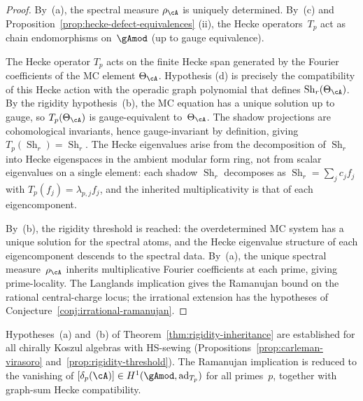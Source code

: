 \begin{proof}
By~(a), the spectral measure $\rho_\cA$ is uniquely determined.
By~(c) and Proposition~\ref{prop:hecke-defect-equivalences}%
(ii), the Hecke operators~$T_p$ act as chain endomorphisms
on~$\gAmod$ (up to gauge equivalence).

The Hecke operator $T_p$ acts on the finite Hecke span generated by
the Fourier coefficients of the MC element $\Theta_\cA$. Hypothesis
\textup{(d)} is precisely the compatibility of this Hecke action with
the operadic graph polynomial that defines
$\operatorname{Sh}_r(\Theta_\cA)$.
By the rigidity hypothesis~(b), the MC equation has a unique
solution up to gauge, so $T_p(\Theta_\cA)$ is gauge-equivalent
to~$\Theta_\cA$. The shadow projections are cohomological
invariants, hence gauge-invariant by definition, giving
$T_p(\operatorname{Sh}_r) = \operatorname{Sh}_r$.
The Hecke eigenvalues arise from the decomposition of
$\operatorname{Sh}_r$ into Hecke eigenspaces in the ambient
modular form ring, not from scalar eigenvalues on a single
element: each shadow $\operatorname{Sh}_r$ decomposes as
$\operatorname{Sh}_r = \sum_j c_j f_j$ with $T_p(f_j)
= \lambda_{p,j} f_j$, and the inherited multiplicativity
is that of each eigencomponent.

By~(b), the rigidity threshold is reached: the overdetermined
MC system has a unique solution for the spectral atoms, and
the Hecke eigenvalue structure of each eigencomponent descends
to the spectral data. By~(a), the unique spectral
measure~$\rho_\cA$ inherits multiplicative Fourier coefficients
at each prime, giving prime-locality. The Langlands implication gives
the Ramanujan bound on the rational central-charge locus; the
irrational extension has the hypotheses of
Conjecture~\ref{conj:irrational-ramanujan}.
\end{proof}

\begin{conjecture}%
\label{conj:conditional-ramanujan}%
%
Hypotheses~\textup{(a)} and~\textup{(b)} of
Theorem~\textup{\ref{thm:rigidity-inheritance}} are
established for all chirally Koszul algebras with HS-sewing
\textup{(}Propositions~\textup{\ref{prop:carleman-virasoro}}
and~\textup{\ref{prop:rigidity-threshold}}\textup{)}.
The Ramanujan implication is reduced to the vanishing of
$[\delta_p(\cA)] \in H^1(\gAmod, \mathrm{ad}_{T_p})$ for all
primes~$p$, together with graph-sum Hecke compatibility.
\end{conjecture}

